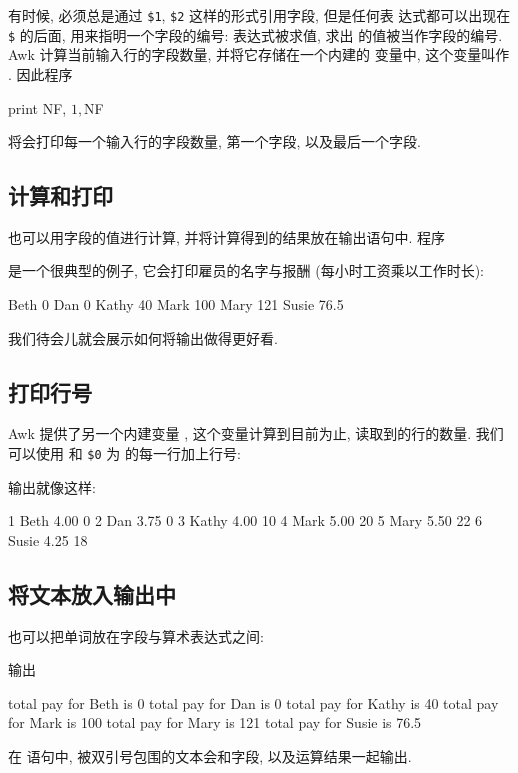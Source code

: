 有时候, 必须总是通过 \verb'$1', \verb'$2' 这样的形式引用字段, 但是任何表
达式都可以出现在 \verb'$' 的后面, 用来指明一个字段的编号: 表达式被求值, 求出
的值被当作字段的编号. Awk 计算当前输入行的字段数量, 并将它存储在一个内建的
变量中, 这个变量叫作 \nf. 因此程序
\begin{awkcode}
    { print NF, $1, $NF }
\end{awkcode}
将会打印每一个输入行的字段数量, 第一个字段, 以及最后一个字段.

\subsection{计算和打印}
\label{subsec:computing_and_printing}

也可以用字段的值进行计算, 并将计算得到的结果放在输出语句中. 程序
是一个很典型的例子, 它会打印雇员的名字与报酬 (每小时工资乘以工作时长):
\begin{awkcode}
    Beth 0
    Dan 0
    Kathy 40
    Mark 100
    Mary 121
    Susie 76.5
\end{awkcode}
我们待会儿就会展示如何将输出做得更好看.

\subsection{打印行号}
\label{subsec:printing_line_numbers}

Awk 提供了另一个内建变量 \nr, 这个变量计算到目前为止, 读取到的行的数量.
我们可以使用 \nr 和 \verb'$0' 为  的每一行加上行号:
输出就像这样:
\begin{awkcode}
    1 Beth    4.00    0
    2 Dan     3.75    0
    3 Kathy   4.00    10
    4 Mark    5.00    20
    5 Mary    5.50    22
    6 Susie   4.25    18
\end{awkcode}

\subsection{将文本放入输出中}
\label{subsec:putting_text_in_the_output}

也可以把单词放在字段与算术表达式之间:
输出
\begin{awkcode}
    total pay for Beth is 0
    total pay for Dan is 0
    total pay for Kathy is 40
    total pay for Mark is 100
    total pay for Mary is 121
    total pay for Susie is 76.5
\end{awkcode}
在 \print 语句中, 被双引号包围的文本会和字段, 以及运算结果一起输出.

